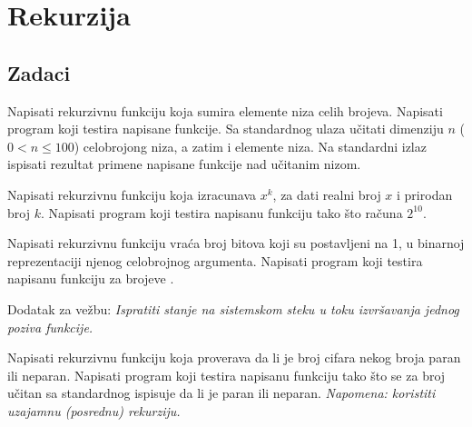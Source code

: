 
\chapter{Rekurzija}

\section{Zadaci}

\begin{Exercise}[label=101]
Napisati rekurzivnu funkciju koja sumira elemente niza celih brojeva.  Napisati program koji testira napisane funkcije. Sa standardnog ulaza učitati dimenziju $n$  ($0 < n \leq 100$) celobrojong
niza, a zatim i elemente niza. Na standardni izlaz ispisati
rezultat primene napisane funkcije nad učitanim
nizom.
\end{Exercise}
\begin{Answer}[ref=101]
\end{Answer}

\begin{Exercise}[label=102]
 Napisati rekurzivnu funkciju koja izracunava  $x^k$,  za dati realni broj $x$ i prirodan broj $k$. Napisati program koji testira napisanu funkciju tako što računa $2^{10}$.
\end{Exercise}
\begin{Answer}[ref=102]
\end{Answer}


\begin{Exercise}[label=103]
Napisati rekurzivnu funkciju vraća broj bitova koji su postavljeni na 1, u binarnoj reprezentaciji njenog celobrojnog argumenta.  Napisati program koji testira napisanu funkciju za brojeve .
  
  Dodatak za vežbu: \emph{Ispratiti stanje na sistemskom steku u toku izvršavanja jednog poziva funkcije.}
\end{Exercise}
\begin{Answer}[ref=103]
\end{Answer}

\begin{Exercise}[label=104]
 Napisati rekurzivnu funkciju koja proverava da li je broj cifara nekog broja paran ili neparan. Napisati program koji testira napisanu funkciju tako što se za broj učitan sa standardnog ispisuje da li je paran ili neparan.
 \emph{Napomena: koristiti uzajamnu (posrednu) rekurziju.}
\end{Exercise}
\begin{Answer}[ref=104]
\end{Answer}

